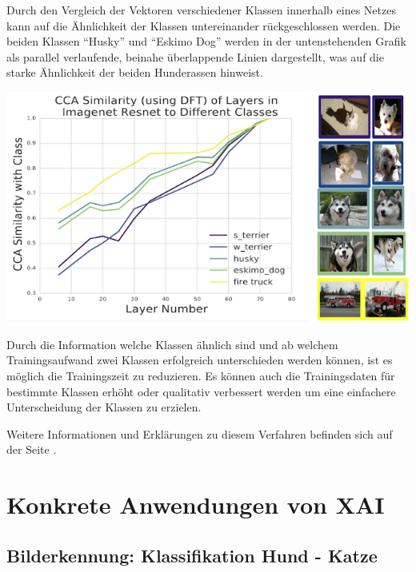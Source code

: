 \documentclass[
  12pt, %
  a4paper, %
  oneside, %
  openany, 
  numbers=noenddot, %
  BCOR=5mm, %
  parskip=half*, %
  thesis, %
]{bfhbook}
\begin{document}
Durch den Vergleich der Vektoren verschiedener Klassen innerhalb eines Netzes kann auf die Ähnlichkeit der Klassen untereinander rückgeschlossen werden. Die beiden Klassen ``Husky'' und ``Eskimo Dog'' werden in der untenstehenden Grafik als parallel verlaufende, beinahe überlappende Linien dargestellt, was auf die starke Ähnlichkeit der beiden Hunderassen hinweist.
\begin{center}
\begin{minipage}[t]{\linewidth}
 	\includegraphics[width=\textwidth]{Bilder/svcca-similarities.png}
\end{minipage}
\end{center}

Durch die Information welche Klassen ähnlich sind und ab welchem Trainingsaufwand zwei Klassen erfolgreich unterschieden werden können, ist es möglich die Trainingszeit zu reduzieren. Es können auch die Trainingsdaten für bestimmte Klassen erhöht oder qualitativ verbessert werden um eine einfachere Unterscheidung der Klassen zu erzielen.

Weitere Informationen und Erklärungen zu diesem Verfahren befinden sich auf der Seite \parencite{svccaLink}.

\chapter{Konkrete Anwendungen von XAI}

\section{Bilderkennung: Klassifikation Hund - Katze}
\end{document}
